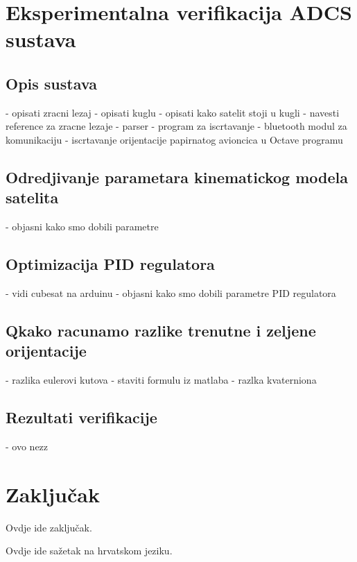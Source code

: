 \documentclass[times, utf8, diplomski, numeric]{templates/template}
\begin{document}
\chapter{Eksperimentalna verifikacija ADCS sustava}{
    \section{Opis sustava}{
        - opisati zracni lezaj
        - opisati kuglu
        - opisati kako satelit stoji u kugli
        - navesti reference za zracne lezaje
        - parser
        - program za iscrtavanje
        - bluetooth modul za komunikaciju
        - iscrtavanje orijentacije papirnatog avioncica u Octave programu
    }

    \section{Odredjivanje parametara kinematickog modela satelita}{
        - objasni kako smo dobili parametre
    }

    \section{Optimizacija PID regulatora}{
        - vidi cubesat na arduinu
        - objasni kako smo dobili parametre PID regulatora
    }

    \section{Qkako racunamo razlike trenutne i zeljene orijentacije}{
        - razlika eulerovi kutova
            - staviti formulu iz matlaba
        - razlka kvaterniona
    }

    \section{Rezultati verifikacije}{
        - ovo nezz
    }
}

\chapter{Zaključak}{
    Ovdje ide zaključak.
}




\begin{sazetak}{
    Ovdje ide sažetak na hrvatskom jeziku.
}

\end{sazetak}

\begin{abstract}{
    Add abstract here.
}

\end{abstract}
\end{document}
